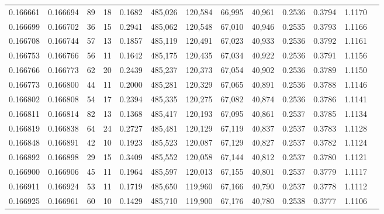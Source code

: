 \begin{tabular}{rrrrrrrrrrrrr}
0.166661 & 0.166694 &    89 &  18 &                                     0.1682 & 485,026 & 120,584 &  66,995 &  40,961 & 0.2536 & 0.3794 & 1.1170 \\
0.166699 & 0.166702 &    36 &  15 &                                     0.2941 & 485,062 & 120,548 &  67,010 &  40,946 & 0.2535 & 0.3793 & 1.1166 \\
0.166708 & 0.166744 &    57 &  13 &                                     0.1857 & 485,119 & 120,491 &  67,023 &  40,933 & 0.2536 & 0.3792 & 1.1161 \\
0.166753 & 0.166766 &    56 &  11 &                                     0.1642 & 485,175 & 120,435 &  67,034 &  40,922 & 0.2536 & 0.3791 & 1.1156 \\
0.166766 & 0.166773 &    62 &  20 &                                     0.2439 & 485,237 & 120,373 &  67,054 &  40,902 & 0.2536 & 0.3789 & 1.1150 \\
0.166773 & 0.166800 &    44 &  11 &                                     0.2000 & 485,281 & 120,329 &  67,065 &  40,891 & 0.2536 & 0.3788 & 1.1146 \\
0.166802 & 0.166808 &    54 &  17 &                                     0.2394 & 485,335 & 120,275 &  67,082 &  40,874 & 0.2536 & 0.3786 & 1.1141 \\
0.166811 & 0.166814 &    82 &  13 &                                     0.1368 & 485,417 & 120,193 &  67,095 &  40,861 & 0.2537 & 0.3785 & 1.1134 \\
0.166819 & 0.166838 &    64 &  24 &                                     0.2727 & 485,481 & 120,129 &  67,119 &  40,837 & 0.2537 & 0.3783 & 1.1128 \\
0.166848 & 0.166891 &    42 &  10 &                                     0.1923 & 485,523 & 120,087 &  67,129 &  40,827 & 0.2537 & 0.3782 & 1.1124 \\
0.166892 & 0.166898 &    29 &  15 &                                     0.3409 & 485,552 & 120,058 &  67,144 &  40,812 & 0.2537 & 0.3780 & 1.1121 \\
0.166900 & 0.166906 &    45 &  11 &                                     0.1964 & 485,597 & 120,013 &  67,155 &  40,801 & 0.2537 & 0.3779 & 1.1117 \\
0.166911 & 0.166924 &    53 &  11 &                                     0.1719 & 485,650 & 119,960 &  67,166 &  40,790 & 0.2537 & 0.3778 & 1.1112 \\
0.166925 & 0.166961 &    60 &  10 &                                     0.1429 & 485,710 & 119,900 &  67,176 &  40,780 & 0.2538 & 0.3777 & 1.1106 \\

\end{tabular}
